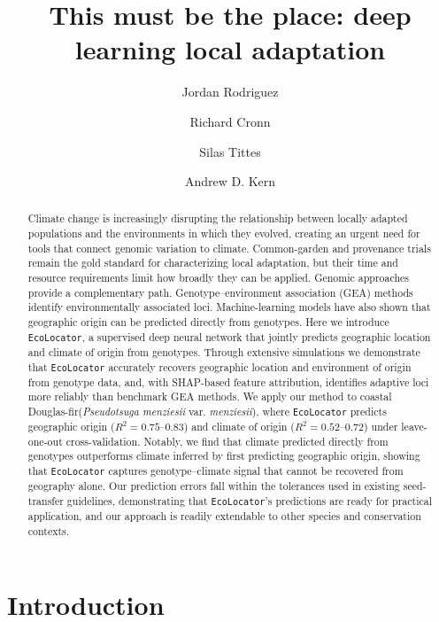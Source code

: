 \documentclass[]{article}
\title{This must be the place: deep learning local adaptation}
\author[1*]{Jordan Rodriguez}
\author[2]{Richard Cronn}
\author[1]{Silas Tittes}
\author[1]{Andrew D. Kern}
\affil[1]{Department of Biology, University of Oregon, Eugene, USA.}
\affil[2]{Pacific Northwest Research Station, USDA Forest Service, Corvallis, Oregon, USA.}
\affil[*]{Address correspondence to: jrodrig8@uoregon.edu}
\newcommand{\dfir}{Douglas-fir\xspace}
\newcommand{\ecolocator}{\texttt{EcoLocator}\xspace}
\begin{document}
\maketitle

\begin{abstract}
Climate change is increasingly disrupting the relationship between 
locally adapted populations and the environments in which they evolved, 
creating an urgent need for tools that connect genomic variation to climate. 
Common-garden and provenance trials remain the gold standard 
for characterizing local adaptation, 
but their time and resource requirements limit how broadly they can be applied. 
Genomic approaches provide a complementary path.
Genotype--environment association (GEA) methods identify environmentally associated loci.
Machine-learning models have also shown that geographic origin can be predicted
directly from genotypes.
Here we introduce \ecolocator, 
a supervised deep neural network that jointly predicts geographic location 
and climate of origin from genotypes. 
Through extensive simulations we demonstrate that
\ecolocator accurately recovers geographic location and environment of origin from genotype data,
and, with SHAP-based feature attribution, identifies adaptive loci more reliably than benchmark GEA methods.
We apply our method to coastal \dfir (\textit{Pseudotsuga menziesii} var. \textit{menziesii}),
where \ecolocator predicts geographic origin ($R^2=0.75$--$0.83$) and climate of origin
($R^2=0.52$--$0.72$) under leave-one-out cross-validation.
Notably, we find that climate predicted directly from genotypes outperforms climate inferred by first
predicting geographic origin, showing that \ecolocator captures genotype--climate signal
that cannot be recovered from geography alone.
Our prediction errors fall within the tolerances used in existing seed-transfer guidelines,
demonstrating that \ecolocator's predictions are ready for practical application, and our approach is
readily extendable to other species and conservation contexts.




\end{abstract}


\section{Introduction}
\end{document}
